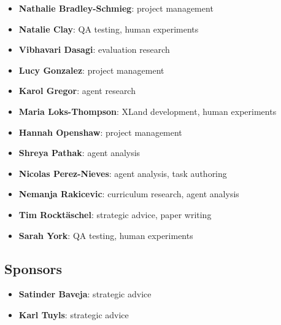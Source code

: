 \documentclass[11pt, a4paper, logo, copyright]{deepmind}
\begin{document}
\begin{itemize}
    \item \textbf{Nathalie Bradley-Schmieg}: project management
    \item \textbf{Natalie Clay}: QA testing, human experiments
    \item \textbf{Vibhavari Dasagi}: evaluation research
    \item \textbf{Lucy Gonzalez}: project management
    \item \textbf{Karol Gregor}: agent research
    \item \textbf{Maria Loks-Thompson}: XLand development, human experiments
    \item \textbf{Hannah Openshaw}: project management
    \item \textbf{Shreya Pathak}: agent analysis
    \item \textbf{Nicolas Perez-Nieves}: agent analysis, task authoring
    \item \textbf{Nemanja Rakicevic}: curriculum research, agent analysis
    \item \textbf{Tim Rockt\"aschel}: strategic advice, paper writing
    \item \textbf{Sarah York}: QA testing, human experiments
\end{itemize}

\subsection{Sponsors}

\begin{itemize}
    \item \textbf{Satinder Baveja}: strategic advice
    \item \textbf{Karl Tuyls}: strategic advice
\end{itemize}




\end{document}
